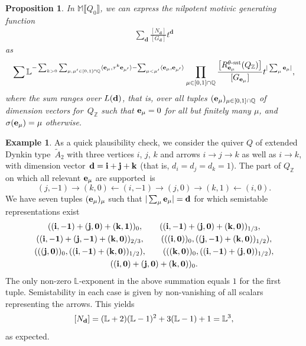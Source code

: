 \documentclass[10pt,a4paper]{amsart}
\numberwithin{equation}{section}
\newtheorem{Proposition}[Theorem]{Proposition}
\theoremstyle{definition}
\newtheorem{Example}[Theorem]{Example}
\begin{document}
\begin{Proposition} \label{prop iden}
In $\mathbb{M} \llbracket Q_0 \rrbracket$, we can express the nilpotent motivic generating function
\begin{align*}
\sum_{\mathbf{d}} \frac{[ N_{\mathbf{d}}]}{[G_{\mathbf{d}}]} t^{\mathbf{d}}
\end{align*}
as
\begin{align*}
 \sum
 \mathbb{L}^{ - \sum_{k > 0} \sum_{\mu, \mu' \in [0,1] \cap \mathbb{Q}} \langle\mathbf{e}_{\mu}, {\tau}^k \mathbf{e}_{\mu'}\rangle - \sum_{\mu < \mu'} \langle\mathbf{e}_{\mu}, \mathbf{e}_{\mu'}\rangle} \prod_{\mu \in [0,1] \cap \mathbb{Q}} \frac{\big[ R_{\mathbf{e}_\mu}^{\theta\text{\rm -sst}}(Q_{\mathbb{Z}}) \big]}{[ G_{\mathbf{e}_\mu}]} t^{|\sum_{\mu} \mathbf{e}_{\mu}|} ,
\end{align*}
where the sum ranges over $L({\bf d})$, that is, over all tuples $({\bf e}_\mu)_{\mu\in[0,1]\cap\mathbb{Q}}$ of dimension vectors for~$Q_\mathbb{Z}$ such that ${\bf e}_\mu=0$ for all but finitely many $\mu$, and $\sigma({\bf e}_\mu)=\mu$ otherwise.
\end{Proposition}

\begin{Example} As a quick plausibility check, we consider the quiver $Q$ of extended Dynkin type~$\tilde{A}_2$ with three vertices $i$, $j$, $k$ and arrows $i\rightarrow j\rightarrow k$ as well as $i\rightarrow k$, with dimension vector~${{\bf d}={\bf i}+{\bf j}+{\bf k}}$ (that is, $d_i=d_j=d_k=1$). The part of $Q_\mathbb{Z}$ on which all relevant ${\bf e}_\mu$ are supported~is
\[(j,-1)\rightarrow(k,0)\leftarrow(i,-1)\rightarrow(j,0)\rightarrow(k,1)\leftarrow(i,0).\]
We have seven tuples $({\bf e}_\mu)_\mu$ such that $|\sum_\mu{\bf e}_\mu|={\bf d}$ for which semistable representations exist
\begin{gather*}
 ({\bf(i,-1)}+{\bf(j,0)}+{\bf(k,1)})_0,\qquad
({\bf(i,-1)}+{\bf(j,0)}+{\bf(k,0)})_{1/3},\\
({\bf(i,-1)}+{\bf(j,-1)}+{\bf(k,0)})_{2/3},\qquad
(({\bf(i,0)})_0,({\bf(j,-1)}+{\bf(k,0)})_{1/2}),\\
(({\bf(j,0)})_0,({\bf(i,-1)}+{\bf(k,0)})_{1/2}),\qquad
(({\bf(k,0)})_0,({\bf(i,-1)}+{\bf(j,0)})_{1/2}),\\
({\bf(i,0)}+{\bf(j,0)}+{\bf(k,0)})_0.\end{gather*}
The only non-zero $\mathbb{L}$-exponent in the above summation equals $1$ for the first tuple. Semistability in each case is given by non-vanishing of all scalars representing the arrows. This yields
\[[N_{\bf d}]=(\mathbb{L}+2)(\mathbb{L}-1)^2+3(\mathbb{L}-1)+1=\mathbb{L}^3,\]
as expected.
\end{Example}
\end{document}
